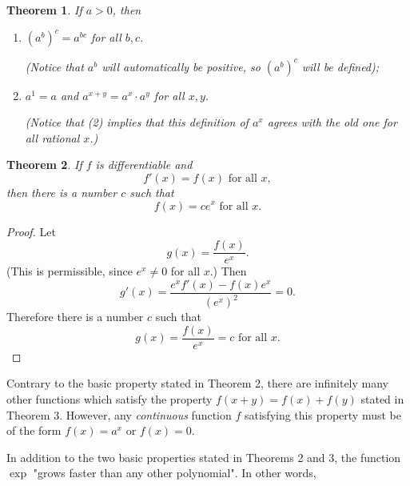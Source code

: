 \documentclass{article}
\numberwithin{corollary}{subsection}
\numberwithin{definition}{subsection}
\numberwithin{lemma}{subsection}
\newtheorem{theorem}{Theorem}
\numberwithin{theorem}{subsection}
\begin{document}
\begin{theorem}
  If $a > 0$, then
  \begin{enumerate}
    \item $(a^b)^c = a^{bc}$ for all $b, c$.

      (Notice that $a^b$ will automatically be positive, so $(a^b)^c$ will be
      defined);
    \item $a^1 = a$ and $a^{x + y} = a^x \cdot a^y$ for all $x, y$.

      (Notice that (2) implies that this definition of $a^x$ agrees with the
      old one for all rational $x$.)
  \end{enumerate}
\end{theorem}

\begin{theorem}
  If $f$ is differentiable and \[ f'(x) = f(x) \text{ for all } x, \] then
  there is a number $c$ such that \[ f(x) = ce^x \text{ for all } x. \]
\end{theorem}
\begin{proof}
  Let \[ g(x) = \frac{f(x)}{e^x}. \] (This is permissible, since $e^x \neq 0$
  for all $x$.) Then \[
    g'(x) = \frac{e^xf'(x) - f(x)e^x}{(e^x)^2} = 0.
  \] Therefore there is a number $c$ such that \[
    g(x) = \frac{f(x)}{e^x} = c \text{ for all } x.
  \]
\end{proof}

Contrary to the basic property stated in Theorem 2, there are infinitely many
other functions which satisfy the property $f(x + y) = f(x) + f(y)$ stated in
Theorem 3. However, any \emph{continuous} function $f$ satisfying this property
must be of the form $f(x) = a^x$ or $f(x) = 0$.

In addition to the two basic properties stated in Theorems 2 and 3, the
function $\exp$ "grows faster than any other polynomial". In other words,
\end{document}
